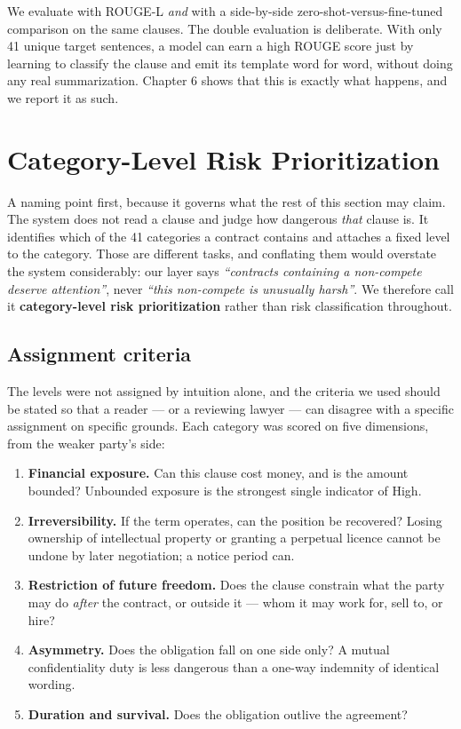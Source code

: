 We evaluate with ROUGE-L \emph{and} with a side-by-side zero-shot-versus-fine-tuned comparison on the same clauses. The double evaluation is deliberate. With only 41 unique target sentences, a model can earn a high ROUGE score just by learning to classify the clause and emit its template word for word, without doing any real summarization. Chapter 6 shows that this is exactly what happens, and we report it as such.

\section{Category-Level Risk Prioritization}
\label{sec:risk}
A naming point first, because it governs what the rest of this section may claim. The system does not read a clause and judge how dangerous \emph{that} clause is. It identifies which of the 41 categories a contract contains and attaches a fixed level to the category. Those are different tasks, and conflating them would overstate the system considerably: our layer says \emph{``contracts containing a non-compete deserve attention''}, never \emph{``this non-compete is unusually harsh''}. We therefore call it \textbf{category-level risk prioritization} rather than risk classification throughout.

\subsection{Assignment criteria}
\label{sec:riskcriteria}
The levels were not assigned by intuition alone, and the criteria we used should be stated so that a reader --- or a reviewing lawyer --- can disagree with a specific assignment on specific grounds. Each category was scored on five dimensions, from the weaker party's side:

\begin{enumerate}[itemsep=3pt]
  \item \textbf{Financial exposure.} Can this clause cost money, and is the amount bounded? Unbounded exposure is the strongest single indicator of High.
  \item \textbf{Irreversibility.} If the term operates, can the position be recovered? Losing ownership of intellectual property or granting a perpetual licence cannot be undone by later negotiation; a notice period can.
  \item \textbf{Restriction of future freedom.} Does the clause constrain what the party may do \emph{after} the contract, or outside it --- whom it may work for, sell to, or hire?
  \item \textbf{Asymmetry.} Does the obligation fall on one side only? A mutual confidentiality duty is less dangerous than a one-way indemnity of identical wording.
  \item \textbf{Duration and survival.} Does the obligation outlive the agreement?
\end{enumerate}

